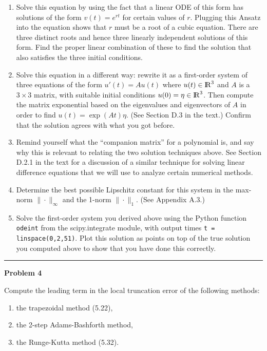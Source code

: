 \documentclass[10pt]{article}
\begin{document}
\begin{enumerate} 
\item Solve this equation by using the fact that a linear ODE of this form has
solutions of the form $v(t) = e^{rt}$ for certain values of $r$.  Plugging this
Ansatz into the equation shows that $r$ must be a root of a cubic equation.  There
are three distinct roots and hence three linearly independent solutions of this
form.  Find the proper linear combination of these to find the solution that also
satisfies the three initial conditions.

\item Solve this equation in a different way: rewrite it as a first-order system of
three equations of the form $u'(t) = Au(t)$ where $u(t)\in{{\rm l} \kern -.15em {\rm R} }^3$ and $A$ is a
$3\times 3$ matrix, with suitable initial conditions $u(0) = \eta \in {{\rm l} \kern -.15em {\rm R} }^3$.
Then compute the matrix exponential based on the eigenvalues and eigenvectors of
$A$ in order to find $u(t) = \exp(At)\eta$.  (See Section D.3 in the text.)
Confirm that the solution agrees with what you got before.  

\item Remind yourself what
the ``companion matrix'' for a polynomial is, and say why this is relevant to
relating the two solution techniques above.  See Section D.2.1 in the text for a
discussion of a similar technique for solving linear difference equations
that we will use to analyze certain numerical methods.

\item
Determine the best possible Lipschitz constant for this system in the max-norm
$\|\cdot\|_\infty$ and the 1-norm $\|\cdot\|_1$. (See Appendix A.3.)

\item Solve the first-order system you derived above
using the Python function {\tt odeint} from the
{scipy.integrate} module, with output times {\tt t = linspace(0,2,51)}.  Plot
this solution as points on top of the true solution you computed above to show that
you have done this correctly.
\end{enumerate} 






\vskip 1cm
\hrule
{\bf Problem 4}

Compute the leading term in the local truncation error of the following
methods:
\begin{enumerate}
\item the trapezoidal method (5.22),
\item the 2-step Adams-Bashforth method,
\item the Runge-Kutta method (5.32).
\end{enumerate} 
\end{document}
